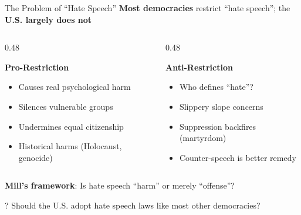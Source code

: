 ﻿\documentclass[aspectratio=169]{beamer}
\begin{document}
\begin{frame}{The Problem of ``Hate Speech''}
\textbf{Most democracies} restrict ``hate speech''; the \textbf{U.S. largely does not}

\vspace{0.2cm}
\begin{columns}[T]
\begin{column}{0.48\textwidth}
\begin{block}{\textbf{Pro-Restriction}}
\begin{itemize}
    \item Causes real psychological harm
    \item Silences vulnerable groups
    \item Undermines equal citizenship
    \item Historical harms (Holocaust, genocide)
\end{itemize}
\end{block}
\end{column}

\begin{column}{0.48\textwidth}
\begin{block}{\textbf{Anti-Restriction}}
\begin{itemize}
    \item Who defines ``hate''?
    \item Slippery slope concerns
    \item Suppression backfires (martyrdom)
    \item Counter-speech is better remedy
\end{itemize}
\end{block}
\end{column}
\end{columns}

\vspace{0.3cm}
\textbf{Mill's framework}: Is hate speech ``harm'' or merely ``offense''?

\begin{alertblock}{?}
Should the U.S. adopt hate speech laws like most other democracies?
\end{alertblock}
\end{frame}
\end{document}
